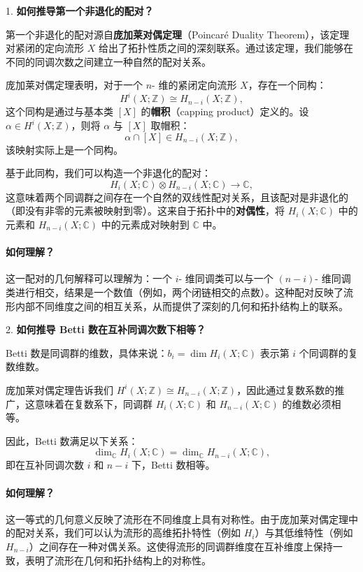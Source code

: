 \documentclass[lang=cn,zihao=5,twoside,fontset=none]{textbook}
\begin{document}
\begin{solution}
	1. \textbf{如何推导第一个非退化的配对？}

第一个非退化的配对源自\textbf{庞加莱对偶定理}（Poincaré Duality Theorem），该定理对紧闭的定向流形 $X$ 给出了拓扑性质之间的深刻联系。通过该定理，我们能够在不同的同调次数之间建立一种自然的配对关系。

庞加莱对偶定理表明，对于一个 $n$- 维的紧闭定向流形 $X$，存在一个同构：
$$
H^i(X; \mathbb{Z}) \cong H_{n-i}(X; \mathbb{Z}),
$$
这个同构是通过与基本类 $[X]$ 的\textbf{帽积}（capping product）定义的。设 $\alpha \in H^i(X; \mathbb{Z})$，则将 $\alpha$ 与 $[X]$ 取帽积：
$$
\alpha \cap [X] \in H_{n-i}(X; \mathbb{Z}),
$$
该映射实际上是一个同构。

基于此同构，我们可以构造一个非退化的配对：
$$
H_i(X; \mathbb{C}) \otimes H_{n-i}(X; \mathbb{C}) \rightarrow \mathbb{C},
$$
这意味着两个同调群之间存在一个自然的双线性配对关系，且该配对是非退化的（即没有非零的元素被映射到零）。这来自于拓扑中的\textbf{对偶性}，将 $H_i(X; \mathbb{C})$ 中的元素和 $H_{n-i}(X; \mathbb{C})$ 中的元素成对映射到 $\mathbb{C}$ 中。

\paragraph*{如何理解？}
这一配对的几何解释可以理解为：一个 $i$- 维同调类可以与一个 $(n-i)$- 维同调类进行相交，结果是一个数值（例如，两个闭链相交的点数）。这种配对反映了流形内部不同维度之间的相互关系，从而提供了深刻的几何和拓扑结构上的联系。

2. \textbf{如何推导 Betti 数在互补同调次数下相等？}

Betti 数是同调群的维数，具体来说：$b_i = \dim H_i(X; \mathbb{C})$ 表示第 $i$ 个同调群的复数维数。

庞加莱对偶定理告诉我们 $H^i(X; \mathbb{Z}) \cong H_{n-i}(X; \mathbb{Z})$，因此通过复数系数的推广，这意味着在复数系下，同调群 $H_i(X; \mathbb{C})$ 和 $H_{n-i}(X; \mathbb{C})$ 的维数必须相等。

因此，Betti 数满足以下关系：
$$
\dim_{\mathbb{C}} H_i(X; \mathbb{C}) = \dim_{\mathbb{C}} H_{n-i}(X; \mathbb{C}),
$$
即在互补同调次数 $i$ 和 $n-i$ 下，Betti 数相等。

\paragraph*{如何理解？}
这一等式的几何意义反映了流形在不同维度上具有对称性。由于庞加莱对偶定理中的配对关系，我们可以认为流形的高维拓扑特性（例如 $H_i$）与其低维特性（例如 $H_{n-i}$）之间存在一种对偶关系。这使得流形的同调群维度在互补维度上保持一致，表明了流形在几何和拓扑结构上的对称性。


\end{solution}
\end{document}
